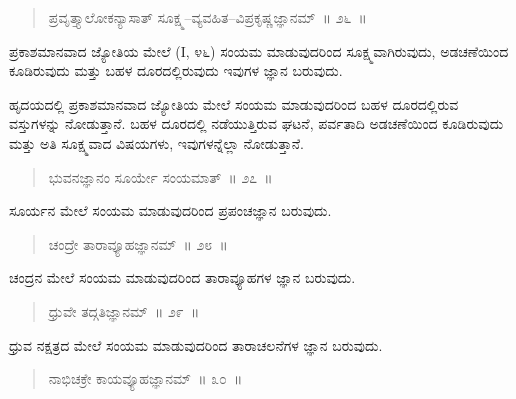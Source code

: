\vspace{-0.3cm}

\begin{verse}
ಪ್ರವೃತ್ತ್ಯಾಲೋಕನ್ಯಾಸಾತ್​ ಸೂಕ್ಷ್ಮ–ವ್ಯವಹಿತ–ವಿಪ್ರಕೃಷ್ಣಜ್ಞಾನಮ್​~॥ ೨೬~॥
\end{verse}

\vspace{-0.3cm}

ಪ್ರಕಾಶಮಾನವಾದ ಜ್ಯೋತಿಯ ಮೇಲೆ (I, ೪೬) ಸಂಯಮ ಮಾಡುವುದರಿಂದ ಸೂಕ್ಷ್ಮವಾಗಿರುವುದು, ಅಡಚಣೆಯಿಂದ ಕೂಡಿರುವುದು ಮತ್ತು ಬಹಳ ದೂರದಲ್ಲಿರುವುದು ಇವುಗಳ ಜ್ಞಾನ ಬರುವುದು. 

ಹೃದಯದಲ್ಲಿ ಪ್ರಕಾಶಮಾನವಾದ ಜ್ಯೋತಿಯ ಮೇಲೆ ಸಂಯಮ ಮಾಡುವುದರಿಂದ ಬಹಳ ದೂರದಲ್ಲಿರುವ ವಸ್ತುಗಳನ್ನು ನೋಡುತ್ತಾನೆ. ಬಹಳ ದೂರದಲ್ಲಿ ನಡೆಯುತ್ತಿರುವ ಘಟನೆ, ಪರ್ವತಾದಿ ಅಡಚಣೆಯಿಂದ ಕೂಡಿರುವುದು ಮತ್ತು ಅತಿ ಸೂಕ್ಷ್ಮವಾದ ವಿಷಯಗಳು, ಇವುಗಳನ್ನೆಲ್ಲಾ ನೋಡುತ್ತಾನೆ. 

\vspace{-0.3cm}

\begin{verse}
ಭುವನಜ್ಞಾನಂ ಸೂರ್ಯೇ ಸಂಯಮಾತ್​~॥ ೨೭~॥
\end{verse}

\vspace{-0.3cm}

ಸೂರ್ಯನ ಮೇಲೆ ಸಂಯಮ ಮಾಡುವುದರಿಂದ ಪ್ರಪಂಚಜ್ಞಾನ ಬರುವುದು. 

\vspace{-0.3cm}

\begin{verse}
ಚಂದ್ರೇ ತಾರಾವ್ಯೂಹಜ್ಞಾನಮ್​~॥ ೨೮~॥
\end{verse}

\vspace{-0.3cm}

ಚಂದ್ರನ ಮೇಲೆ ಸಂಯಮ ಮಾಡುವುದರಿಂದ ತಾರಾವ್ಯೂಹಗಳ ಜ್ಞಾನ ಬರುವುದು. 

\vspace{-0.3cm}

\begin{verse}
ಧ್ರುವೇ ತದ್ಗತಿಜ್ಞಾನಮ್​~॥ ೨೯~॥
\end{verse}

\vspace{-0.3cm}

ಧ್ರುವ ನಕ್ಷತ್ರದ ಮೇಲೆ ಸಂಯಮ ಮಾಡುವುದರಿಂದ ತಾರಾಚಲನೆಗಳ ಜ್ಞಾನ ಬರುವುದು. 

\vspace{-0.3cm}

\begin{verse}
ನಾಭಿಚಕ್ರೇ ಕಾಯವ್ಯೂಹಜ್ಞಾನಮ್​~॥ ೩೦~॥
\end{verse}

\vspace{-0.3cm}

